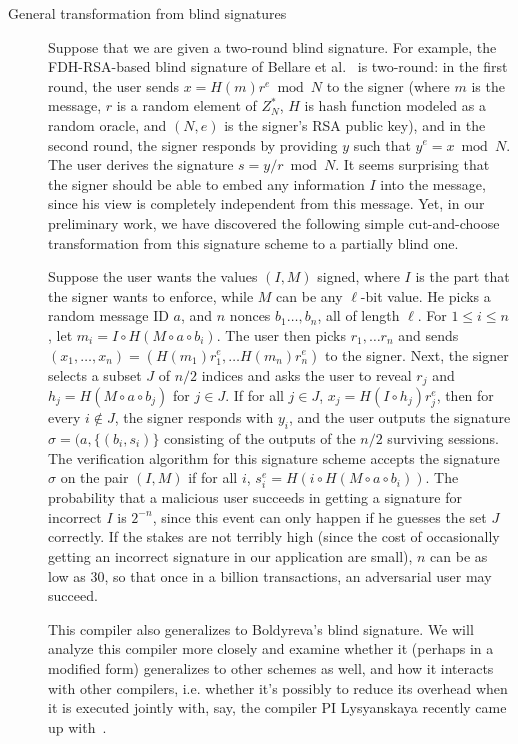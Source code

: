 \begin{description}
\item[General transformation from blind signatures] Suppose that we are given a two-round blind signature.  For example, the FDH-RSA-based blind signature of Bellare et al.~\cite{} is two-round: in the first round, the user sends $x=H(m)r^e \bmod N$ to the signer (where $m$ is the message, $r$ is a random element of $Z_N^*$, $H$ is hash function modeled as a random oracle, and $(N,e)$ is the signer's RSA public key), and in the second round, the signer responds by providing $y$ such that $y^e=x\bmod N$.  The user derives the signature $s = y/r \bmod N$.  It seems surprising that the signer should be able to embed any information $I$ into the message, since his view is completely independent from this message.  Yet, in our preliminary work, we have discovered the following simple cut-and-choose transformation from this signature scheme to a partially blind one.  

Suppose the user wants the values $(I,M)$ signed, where $I$ is the part that the signer wants to enforce, while $M$ can be any $\ell$-bit value.  He picks a random message ID $a$, and $n$ nonces $b_1\ldots,b_n$, all of length $\ell$.  For $1\leq i \leq n$, let $m_i = I \circ H(M\circ a \circ b_i)$.  The user then picks $r_1,\ldots r_n$ and sends $(x_1,\ldots,x_n) = (H(m_1)r_1^e,\ldots H(m_n)r_n^e)$ to the signer.  Next, the signer selects a subset $J$ of $n/2$ indices and asks the user to reveal $r_j$ and $h_j = H(M\circ a \circ b_j)$ for $j\in J$.  If for all $j \in J$, $x_j = H(I \circ h_j)r_j^e$, then for every $i \notin J$, the signer responds with $y_i$, and the user outputs the signature $\sigma = (a,\{(b_i,s_i)\}$ consisting of the outputs of the $n/2$ surviving sessions.  The verification algorithm for this signature scheme accepts the signature $\sigma$ on the pair $(I,M)$ if for all $i$, $s_i^e = H(i \circ H(M\circ a \circ b_i))$.  The probability that a malicious user succeeds in getting a signature for incorrect $I$ is $2^{-n}$, since this event can only happen if he guesses the set $J$ correctly.  If the stakes are not terribly high (since the cost of occasionally getting an incorrect signature in our application are small), $n$ can be as low as 30, so that once in a billion transactions, an adversarial user may succeed.  

This compiler also generalizes to Boldyreva's blind signature.  We will analyze this compiler more closely and examine whether it (perhaps in a modified form) generalizes to other schemes as well, and how it interacts with other compilers, i.e. whether it's possibly to reduce its overhead when it is executed jointly with, say, the compiler PI Lysyanskaya recently came up with~\cite{}.


\end{description}
